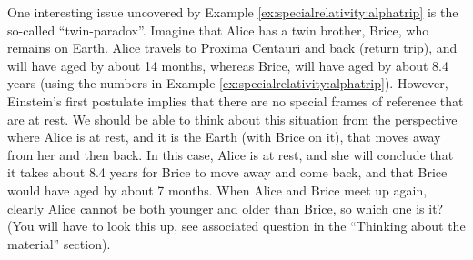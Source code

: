 One interesting issue uncovered by Example \ref{ex:specialrelativity:alphatrip} is the so-called ``twin-paradox''. Imagine that Alice has a twin brother, Brice, who remains on Earth. Alice travels to Proxima Centauri and back (return trip), and will have aged by about 14 months, whereas Brice, will have aged by about 8.4 years (using the numbers in Example \ref{ex:specialrelativity:alphatrip}). However, Einstein's first postulate implies that there are no special frames of reference that are at rest. We should be able to think about this situation from the perspective where Alice is at rest, and it is the Earth (with Brice on it), that moves away from her and then back. In this case, Alice is at rest, and she will conclude that it takes about 8.4 years for Brice to move away and come back, and that Brice would have aged by about 7 months. When Alice and Brice meet up again, clearly Alice cannot be both younger and older than Brice, so which one is it? (You will have to look this up, see associated question in the ``Thinking about the material'' section).

